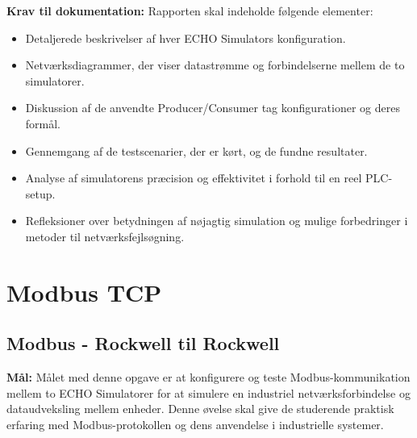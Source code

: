 \textbf{Krav til dokumentation:}
Rapporten skal indeholde følgende elementer:
\begin{itemize}
	\item Detaljerede beskrivelser af hver ECHO Simulators konfiguration.
	\item Netværksdiagrammer, der viser datastrømme og forbindelserne mellem de to simulatorer.
	\item Diskussion af de anvendte Producer/Consumer tag konfigurationer og deres formål.
	\item Gennemgang af de testscenarier, der er kørt, og de fundne resultater.
	\item Analyse af simulatorens præcision og effektivitet i forhold til en reel PLC-setup.
	\item Refleksioner over betydningen af nøjagtig simulation og mulige forbedringer i metoder til netværksfejlsøgning.
\end{itemize}


\section{Modbus TCP}
\label{subsec:modbus_communication_echo_simulators}

\subsection*{Modbus - Rockwell til Rockwell}
\textbf{Mål:} Målet med denne opgave er at konfigurere og teste Modbus-kommunikation mellem to ECHO Simulatorer for at simulere en industriel netværksforbindelse og dataudveksling mellem enheder. Denne øvelse skal give de studerende praktisk erfaring med Modbus-protokollen og dens anvendelse i industrielle systemer.

